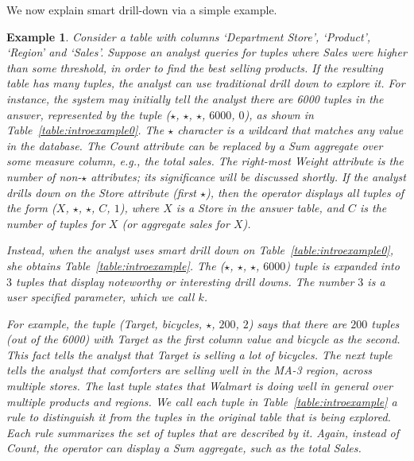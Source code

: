 \documentclass[10pt,journal,compsoc]{IEEEtran}
\newtheorem{example}[definition]{Example}
\begin{document}
We now explain smart drill-down via a simple example.

\begin{example}\label{ex:introexample}
Consider a table with columns `Department Store', `Product', `Region'
and `Sales'. Suppose an analyst queries for tuples
where Sales were higher than some threshold, in order
to find the best selling products.
If the resulting table has many tuples,
the analyst can use traditional drill down to explore it.
For instance, the system may initially tell the analyst there are
6000 tuples in the answer, represented by the tuple ($\star$, $\star$, $\star$, $6000$, $0$),
as shown in Table~\ref{table:introexample0}.
The $\star$ character is a wildcard that matches any value in the database.
The Count attribute can be replaced by a Sum aggregate over some measure column,
e.g., the total sales.
The right-most Weight attribute is the number of non-$\star$ attributes; 
its significance will be discussed shortly.
If the analyst drills down on the Store attribute (first $\star$),
then the operator displays all tuples of the form ($X$, $\star$, $\star$, $C$, $1$),
where $X$ is a Store in the answer table, and $C$
is the number of tuples for $X$ (or aggregate sales for $X$).

Instead, when the analyst uses smart drill down on Table~\ref{table:introexample0},
she obtains Table~\ref{table:introexample}.
The ($\star$, $\star$, $\star$, $6000$) tuple is expanded into $3$ tuples
that display noteworthy or interesting drill downs.
The number $3$ is a user specified parameter, which we call $k$.

For example, the tuple (Target, bicycles, $\star$, $200$, $2$)
says that there are $200$ tuples (out of the 6000) with
Target as the first column value and bicycle as the second.
This fact tells the analyst that Target is selling a lot of bicycles.
The next tuple tells the analyst that comforters are selling well in
the MA-3 region, across multiple stores. The last tuple
states that Walmart is doing well in general over multiple products and regions.
We call each tuple in Table~\ref{table:introexample} a {\em rule}
to distinguish it from the tuples in the original table that is being explored.
Each rule summarizes the set of tuples that are described by it.
Again, instead of Count, the operator can display a Sum aggregate, such as
the total Sales.



\end{example}
\end{document}
